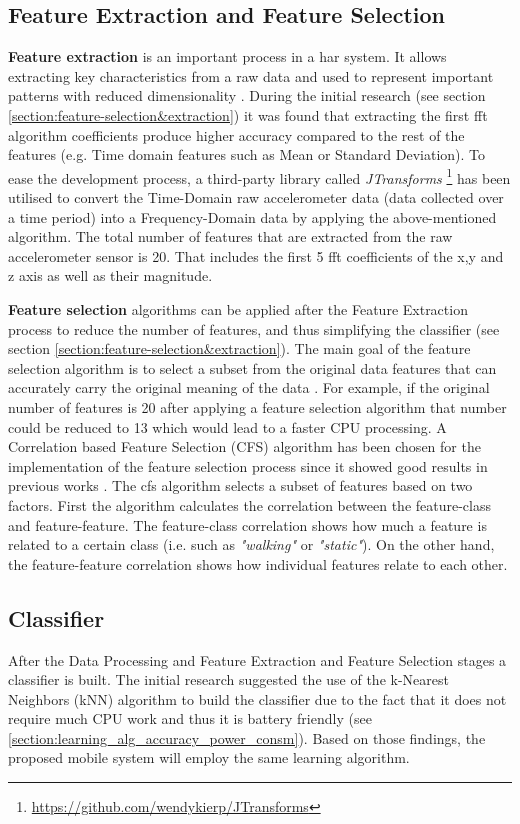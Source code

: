     \subsection{Feature Extraction and Feature Selection}
    \textbf{Feature extraction} is an important process in a \gls{har} system. It allows extracting key characteristics from a raw data and used to represent important patterns with reduced dimensionality \citep[154]{torreshuitzil2015b}. During the initial research (see section \ref{section:feature-selection&extraction}) it was found that extracting the first \gls{fft} algorithm coefficients produce higher accuracy compared to the rest of the features (e.g. Time domain features such as Mean or Standard Deviation). To ease the development process, a third-party library called \textit{JTransforms} \footnote{\url{https://github.com/wendykierp/JTransforms}} has been utilised to convert the Time-Domain raw accelerometer data (data collected over a time period) into a Frequency-Domain data by applying the above-mentioned algorithm. The total number of features that are extracted from the raw accelerometer sensor is 20. That includes the first 5 \gls{fft} coefficients of the x,y and z axis as well as their magnitude. 
    
    \textbf{Feature selection} algorithms can be applied after the Feature Extraction process to reduce the number of features, and thus simplifying the classifier (see section \ref{section:feature-selection&extraction}). The main goal of the feature selection algorithm is to select a subset from the original data features that can accurately carry the original meaning of the data \citep[22]{wu2008}. For example, if the original number of features is 20 after applying a feature selection algorithm that number could be reduced to 13 which would lead to a faster CPU processing. A Correlation based Feature Selection (CFS) algorithm has been chosen for the implementation of the feature selection process since it showed good results in previous works \citep[220-224]{dinhle2015}. The \gls{cfs} algorithm selects a subset of features based on two factors. First the algorithm calculates the correlation between the feature-class and feature-feature. The feature-class correlation shows how much a feature is related to a certain class (i.e. such as \textit{"walking"} or \textit{"static"}). On the other hand, the feature-feature correlation shows how individual features relate to each other.
    
    \subsection{Classifier}
    After the Data Processing and Feature Extraction and Feature Selection stages a classifier is built. The initial research suggested the use of the k-Nearest Neighbors (kNN) algorithm to build the classifier due to the fact that it does not require much CPU work and thus it is battery friendly (see \ref{section:learning_alg_accuracy_power_consm}). Based on those findings, the proposed mobile system will employ the same learning algorithm. 
    

